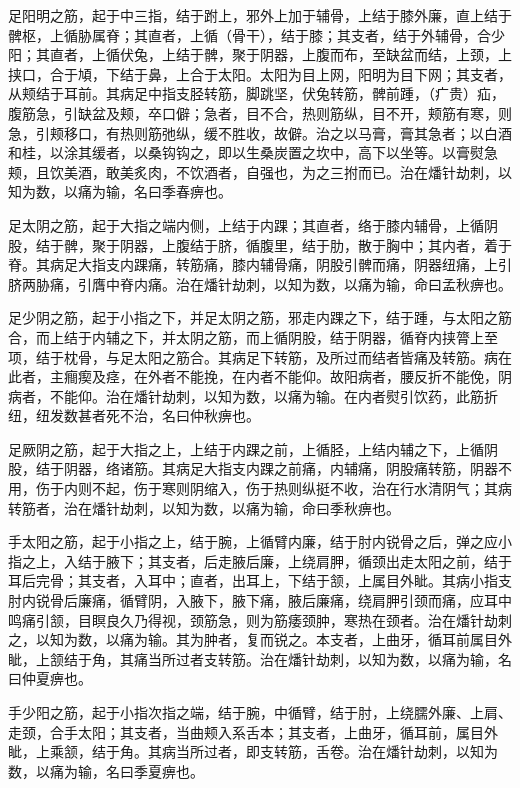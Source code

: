 \documentclass[a4paper,12pt,UTF8,twoside]{ctexbook}
\begin{document}
	足阳明之筋，起于中三指，结于跗上，邪外上加于辅骨，上结于膝外廉，直上结于髀枢，上循胁属脊；其直者，上循（骨干），结于膝；其支者，结于外辅骨，合少阳；其直者，上循伏兔，上结于髀，聚于阴器，上腹而布，至缺盆而结，上颈，上挟口，合于頄，下结于鼻，上合于太阳。太阳为目上网，阳明为目下网；其支者，从颊结于耳前。其病足中指支胫转筋，脚跳坚，伏兔转筋，髀前踵，（疒贵）疝，腹筋急，引缺盆及颊，卒口僻；急者，目不合，热则筋纵，目不开，颊筋有寒，则急，引颊移口，有热则筋弛纵，缓不胜收，故僻。治之以马膏，膏其急者；以白酒和桂，以涂其缓者，以桑钩钩之，即以生桑炭置之坎中，高下以坐等。以膏熨急颊，且饮美酒，敢美炙肉，不饮酒者，自强也，为之三拊而已。治在燔针劫刺，以知为数，以痛为输，名曰季春痹也。
	
	足太阴之筋，起于大指之端内侧，上结于内踝；其直者，络于膝内辅骨，上循阴股，结于髀，聚于阴器，上腹结于脐，循腹里，结于肋，散于胸中；其内者，着于脊。其病足大指支内踝痛，转筋痛，膝内辅骨痛，阴股引髀而痛，阴器纽痛，上引脐两胁痛，引膺中脊内痛。治在燔针劫刺，以知为数，以痛为输，命曰孟秋痹也。
	
	足少阴之筋，起于小指之下，并足太阴之筋，邪走内踝之下，结于踵，与太阳之筋合，而上结于内辅之下，并太阴之筋，而上循阴股，结于阴器，循脊内挟膂上至项，结于枕骨，与足太阳之筋合。其病足下转筋，及所过而结者皆痛及转筋。病在此者，主癎瘈及痉，在外者不能挽，在内者不能仰。故阳病者，腰反折不能俛，阴病者，不能仰。治在燔针劫刺，以知为数，以痛为输。在内者熨引饮药，此筋折纽，纽发数甚者死不治，名曰仲秋痹也。
	
	足厥阴之筋，起于大指之上，上结于内踝之前，上循胫，上结内辅之下，上循阴股，结于阴器，络诸筋。其病足大指支内踝之前痛，内辅痛，阴股痛转筋，阴器不用，伤于内则不起，伤于寒则阴缩入，伤于热则纵挺不收，治在行水清阴气；其病转筋者，治在燔针劫刺，以知为数，以痛为输，命曰季秋痹也。
	
	手太阳之筋，起于小指之上，结于腕，上循臂内廉，结于肘内锐骨之后，弹之应小指之上，入结于腋下；其支者，后走腋后廉，上绕肩胛，循颈出走太阳之前，结于耳后完骨；其支者，入耳中；直者，出耳上，下结于颔，上属目外眦。其病小指支肘内锐骨后廉痛，循臂阴，入腋下，腋下痛，腋后廉痛，绕肩胛引颈而痛，应耳中鸣痛引颔，目瞑良久乃得视，颈筋急，则为筋痿颈肿，寒热在颈者。治在燔针劫刺之，以知为数，以痛为输。其为肿者，复而锐之。本支者，上曲牙，循耳前属目外眦，上颔结于角，其痛当所过者支转筋。治在燔针劫刺，以知为数，以痛为输，名曰仲夏痹也。
	
	手少阳之筋，起于小指次指之端，结于腕，中循臂，结于肘，上绕臑外廉、上肩、走颈，合手太阳；其支者，当曲颊入系舌本；其支者，上曲牙，循耳前，属目外眦，上乘颔，结于角。其病当所过者，即支转筋，舌卷。治在燔针劫刺，以知为数，以痛为输，名曰季夏痹也。
	
\end{document}
